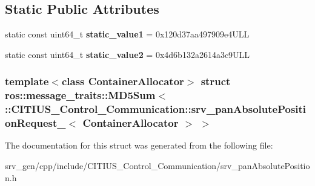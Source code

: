\subsection*{\-Static \-Public \-Attributes}
\begin{DoxyCompactItemize}
\item 
\hypertarget{structros_1_1message__traits_1_1_m_d5_sum_3_01_1_1_c_i_t_i_u_s___control___communication_1_1srv_a1e4ccef8a181c5bbee087481556a5a1_a7f15e0112be415c1e572fdad85ff8446}{static const uint64\-\_\-t {\bfseries static\-\_\-value1} = 0x120d37aa497909e4\-U\-L\-L}\label{structros_1_1message__traits_1_1_m_d5_sum_3_01_1_1_c_i_t_i_u_s___control___communication_1_1srv_a1e4ccef8a181c5bbee087481556a5a1_a7f15e0112be415c1e572fdad85ff8446}

\item 
\hypertarget{structros_1_1message__traits_1_1_m_d5_sum_3_01_1_1_c_i_t_i_u_s___control___communication_1_1srv_a1e4ccef8a181c5bbee087481556a5a1_a03ec4a3ba5541caa38bb4dd3165fa699}{static const uint64\-\_\-t {\bfseries static\-\_\-value2} = 0x4d6b132a2614a3c9\-U\-L\-L}\label{structros_1_1message__traits_1_1_m_d5_sum_3_01_1_1_c_i_t_i_u_s___control___communication_1_1srv_a1e4ccef8a181c5bbee087481556a5a1_a03ec4a3ba5541caa38bb4dd3165fa699}

\end{DoxyCompactItemize}
\subsubsection*{template$<$class Container\-Allocator$>$ struct ros\-::message\-\_\-traits\-::\-M\-D5\-Sum$<$ \-::\-C\-I\-T\-I\-U\-S\-\_\-\-Control\-\_\-\-Communication\-::srv\-\_\-pan\-Absolute\-Position\-Request\-\_\-$<$ Container\-Allocator $>$ $>$}



\-The documentation for this struct was generated from the following file\-:\begin{DoxyCompactItemize}
\item 
srv\-\_\-gen/cpp/include/\-C\-I\-T\-I\-U\-S\-\_\-\-Control\-\_\-\-Communication/srv\-\_\-pan\-Absolute\-Position.\-h\end{DoxyCompactItemize}
